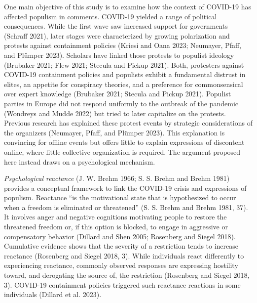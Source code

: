 \documentclass[
]{ccr}
\begin{document}
One main objective of this study is to examine how the context of
COVID-19 has affected populism in comments. COVID-19 yielded a range of
political consequences. While the first wave saw increased support for
governments (Schraff 2021), later stages were characterized by growing
polarization and protests against containment policies (Kriesi and Oana
2023; Neumayer, Pfaff, and Plümper 2023). Scholars have linked those
protests to populist ideology (Brubaker 2021; Flew 2021; Stecula and
Pickup 2021). Both, protesters against COVID-19 containment policies and
populists exhibit a fundamental distrust in elites, an appetite for
conspiracy theories, and a preference for commonsensical over expert
knowledge (Brubaker 2021; Stecula and Pickup 2021). Populist parties in
Europe did not respond uniformly to the outbreak of the pandemic
(Wondreys and Mudde 2022) but tried to later capitalize on the protests.
Previous research has explained these protest events by strategic
considerations of the organizers (Neumayer, Pfaff, and Plümper 2023).
This explanation is convincing for offline events but offers little to
explain expressions of discontent online, where little collective
organization is required. The argument proposed here instead draws on a
psychological mechanism.

\emph{Psychological reactance} (J. W. Brehm 1966; S. S. Brehm and Brehm
1981) provides a conceptual framework to link the COVID-19 crisis and
expressions of populism\emph{.} Reactance ``is the motivational state
that is hypothesized to occur when a freedom is eliminated or
threatened'' (S. S. Brehm and Brehm 1981, 37). It involves anger and
negative cognitions motivating people to restore the threatened freedom
or, if this option is blocked, to engage in aggressive or compensatory
behavior (Dillard and Shen 2005; Rosenberg and Siegel 2018). Cumulative
evidence shows that the severity of a restriction tends to increase
reactance (Rosenberg and Siegel 2018, 3). While individuals react
differently to experiencing reactance, commonly observed responses are
expressing hostility toward, and derogating the source of, the
restriction (Rosenberg and Siegel 2018, 3). COVID-19 containment
policies triggered such reactance reactions in some individuals (Dillard
et al. 2023).
\end{document}
